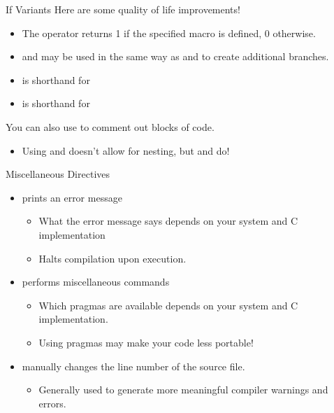 \documentclass[11pt]{beamer}
\let\OldTexttt\texttt
\renewcommand{\texttt}[1]{\OldTexttt{\color{teal}{#1}}}
\begin{document}
\begin{frame}{If Variants}
Here are some quality of life improvements! 
\begin{itemize}
\item The \texttt{defined(<Macro>)} operator returns 1 if the specified macro is defined, 0 otherwise.
\item \texttt{\#elif} and \texttt{\#else} may be used in the same way as \texttt{else if} and \texttt{if} to create additional branches.
\item \texttt{\#ifdef x} is shorthand for \texttt{\#if defined(x)}
\item \texttt{\#ifndef x} is shorthand for \texttt{\#if !defined(x)}
\end{itemize}
You can also use \texttt{\#if} to comment out blocks of code.
\begin{itemize}
\item Using \texttt{/*} and \texttt{*/} doesn't allow for nesting, but \texttt{\#if} and \texttt{\#endif} do!
\end{itemize}
\end{frame}

\begin{frame}{Miscellaneous Directives}
\begin{itemize}
\item \texttt{\#error <tokens>} prints an error message
\begin{itemize}
\item What the error message says depends on your system and C implementation
\item Halts compilation upon execution.
\end{itemize}
\item \texttt{\#pragma <tokens>} performs miscellaneous commands
\begin{itemize}
\item Which pragmas are available depends on your system and C implementation.
\item Using pragmas may make your code less portable! 
\end{itemize}
\item \texttt{\#line <integer>} manually changes the line number of the source file.
\begin{itemize}
\item Generally used to generate more meaningful compiler warnings and errors.
\end{itemize}
\end{itemize}
\end{frame}
\end{document}
